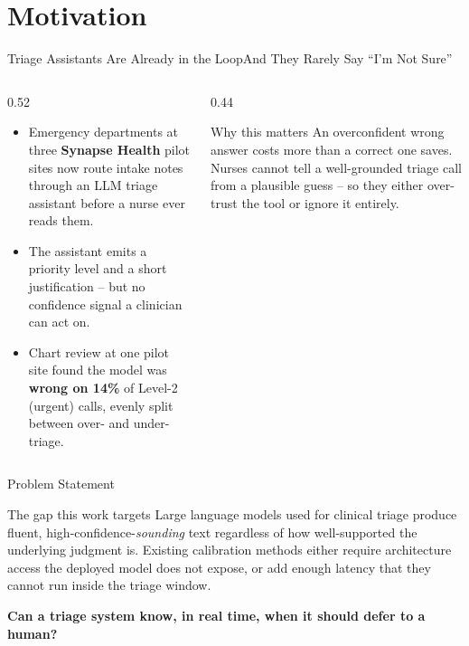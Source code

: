 \section{Motivation}

\begin{frame}{Triage Assistants Are Already in the Loop}{And They Rarely Say ``I'm Not Sure''}
  \begin{columns}[T]
    \begin{column}{0.52\textwidth}
      \begin{itemize}[leftmargin=1.4em]
        \item[\faFlask] Emergency departments at three \textbf{Synapse Health}
          pilot sites now route intake notes through an LLM triage
          assistant before a nurse ever reads them.
        \item[\faFlask] The assistant emits a priority level and a short
          justification -- but no confidence signal a clinician can act on.
        \item[\faFlask] Chart review at one pilot site found the model was
          \textbf{wrong on 14\%} of Level-2 (urgent) calls, evenly split
          between over- and under-triage.
      \end{itemize}
    \end{column}
    \begin{column}{0.44\textwidth}
      \begin{tealbox}{Why this matters}
        \footnotesize
        An overconfident wrong answer costs more than a correct one saves.
        Nurses cannot tell a well-grounded triage call from a plausible
        guess -- so they either over-trust the tool or ignore it entirely.
      \end{tealbox}
    \end{column}
  \end{columns}
\end{frame}

\begin{frame}{Problem Statement}
  \begin{navybox}{The gap this work targets}
    Large language models used for clinical triage produce fluent,
    high-confidence-\emph{sounding} text regardless of how well-supported
    the underlying judgment is. Existing calibration methods either require
    architecture access the deployed model does not expose, or add enough
    latency that they cannot run inside the triage window.
  \end{navybox}
  \par\vspace{10pt}
  \begin{center}
    \Large\color{navy}\bfseries
    Can a triage system know, in real time, when it should defer to a human?
  \end{center}
\end{frame}

